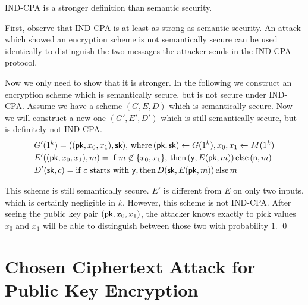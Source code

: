 \begin{theorem}
IND-CPA is a stronger definition than semantic security.
\end{theorem}

\proof
First, observe that IND-CPA is at least as strong as semantic security. An
attack which showed an encryption scheme is not semantically secure can be used
identically to distinguish the two messages the attacker sends in the IND-CPA protocol.

Now we only need to show that it is stronger.
In the following we construct an encryption scheme which is semantically secure, but is not secure
under IND-CPA.
Assume we have
a scheme $(G, E, D)$ which is semantically secure. Now we will construct a new one
$(G', E', D')$ which  is still semantically secure, but is definitely not IND-CPA.
\begin{align*}
& G'(1^k) = ((\mathsf{pk}, x_0, x_1), \mathsf{sk}), \,\text{where}\, (\mathsf{pk},\mathsf{sk}) \gets G(1^k), x_0, x_1 \gets M(1^k) \\
& E'((\mathsf{pk}, x_0, x_1), m) = \text{if } m \not\in\{x_0,x_1\}, \,\text{then}\, (\mathsf{y},E(\mathsf{pk},m)) \,\text{else}\, (\mathsf{n},m) \\
& D'(\mathsf{sk}, c) = \text{if } c \text{ starts with } \mathsf{y}, \text{then}\, D(\mathsf{sk},E(\mathsf{pk},m)) \,\text{else}\, m 
\end{align*}

This scheme is still semantically secure. $E'$ is different from $E$ on only two
inputs, which is certainly negligible in $k$. However, this
scheme is not IND-CPA. After seeing the public key pair $(\mathsf{pk}, x_0, x_1)$, the attacker
knows exactly to pick values $x_0$ and $x_1$ will be able to distinguish between
those two with probability $1$. \qed



\section{Chosen Ciphertext Attack for Public Key Encryption}



